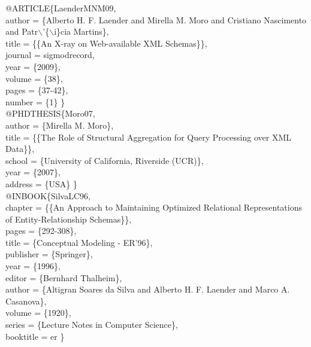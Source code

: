 \documentclass[jidm,a4paper]{jidm} %
\newenvironment{latexcode}
{\ttfamily\vspace{0.1in}\setlength{\parindent}{18pt}}
{\vspace{0.1in}}
\begin{document}
\begin{latexcode}
@ARTICLE\{LaenderMNM09,\\\indent\indent
  author = \{Alberto H. F. Laender and Mirella M. Moro and Cristiano Nascimento\\\indent\indent
	and Patr$\backslash$'\{$\backslash$i\}cia Martins\},\\\indent\indent
  title = \{\{An X-ray on Web-available XML Schemas\}\},\\\indent\indent
  journal = sigmodrecord,\\\indent\indent
  year = \{2009\},\\\indent\indent
  volume = \{38\},\\\indent\indent
  pages = \{37-42\},\\\indent\indent
  number = \{1\} \}\\

@PHDTHESIS\{Moro07,\\\indent\indent
  author = \{Mirella M. Moro\},\\\indent\indent
  title = \{\{The Role of Structural Aggregation for Query Processing over XML Data\}\},\\\indent\indent
  school = \{University of California, Riverside (UCR)\},\\\indent\indent
  year = \{2007\},\\\indent\indent
  address = \{USA\} \}\\

@INBOOK\{SilvaLC96,\\\indent\indent
  chapter = \{\{An Approach to Maintaining Optimized Relational Representations\\\indent\indent
	of Entity-Relationship Schemas\}\},\\\indent\indent
  pages = \{292-308\},\\\indent\indent
  title = \{Conceptual Modeling - ER'96\},\\\indent\indent
  publisher = \{Springer\},\\\indent\indent
  year = \{1996\},\\\indent\indent
  editor = \{Bernhard Thalheim\},\\\indent\indent
  author = \{Altigran Soares da Silva and Alberto H. F. Laender and Marco A. Casanova\},\\\indent\indent
  volume = \{1920\},\\\indent\indent
  series = \{Lecture Notes in Computer Science\},\\\indent\indent
  booktitle = er \}
  
\end{latexcode}
\end{document}
